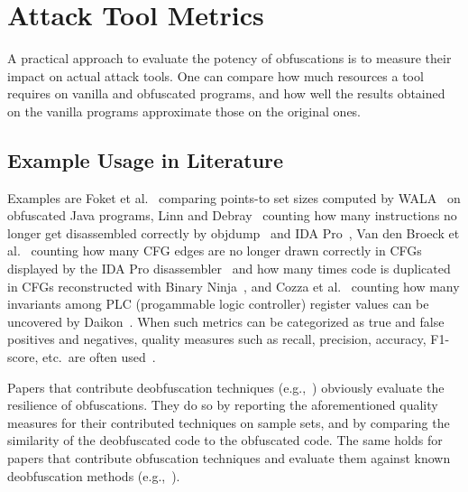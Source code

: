 \section{Attack Tool Metrics}

A practical approach to evaluate the potency of obfuscations is to measure their impact on actual attack tools. One can compare how much resources a tool requires on vanilla and obfuscated programs, and how well the results obtained on the vanilla programs approximate those on the original ones. 

\subsection{Example Usage in Literature}
\label{sec:attack_tool_examples}
Examples are Foket et al.~\cite{Foket14} comparing points-to set sizes computed by WALA~\cite{WALA} on obfuscated Java programs, Linn and Debray~\cite{Linn2003} counting how many instructions no longer get disassembled correctly by objdump~\cite{binutils} and IDA Pro~\cite{IDA}, Van den Broeck et al.~\cite{jens21} counting how many CFG edges are no longer drawn correctly in CFGs displayed by the IDA Pro disassembler~\cite{IDA} and how many times code is duplicated in CFGs reconstructed with Binary Ninja~\cite{ninja}, and Cozza et al.~\cite{mila24} counting how many invariants among PLC (progammable logic controller) register values can be uncovered by Daikon~\cite{Daikon}. When such metrics can be categorized as true and false positives and negatives, quality measures such as recall, precision, accuracy, F1-score, etc.\ are often used~\cite{statistics}.

Papers that contribute deobfuscation techniques (e.g.,~\cite{2022_chosen_instruction_attack_against_commercial_code_virtualization_obfuscators,2021_mba_blast_unveiling_and_simplifying_mixed_boolean_arithmetic_obfuscation,2017_syntia_synthesizing_the_semantics_of_obfuscated_code,2015_a_generic_approach_to_automatic_deobfuscation_of_executable_code}) obviously evaluate the resilience of obfuscations. They do so by reporting the aforementioned quality measures for their contributed techniques on sample sets, and by comparing the similarity of the deobfuscated code to the obfuscated code. The same holds for papers that contribute obfuscation techniques and evaluate them against known deobfuscation methods (e.g.,~\cite{2022_loki_hardening_code_obfuscation_against_automated_attacks,2021_search_based_local_black_box_deobfuscation_understand_improve_and_mitigate}).

